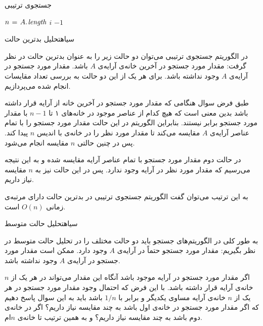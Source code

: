 {\begin{algorithm}
\caption{جستجوی ترتیبی}\label{ch1:alg:lnrSearch}
\begin{latin}
\begin{algorithmic}[1]
		\State $n \mathrel{\hspace{1pt}=\hspace{1pt}} A.\hspace*{1pt}\mathit{length}$
						\State \Return $i$
				\EndIf
		\EndFor
		\State \Return	$-1$		
\EndFunction
\end{algorithmic}
\end{latin}
\end{algorithm}


‌سیاه{تحلیل بدترین حالت}

در الگوریتم جستجوی ترتیبی می‌توان دو حالت زیر را به عنوان بدترین حالت در نظر گرفت:
 مقدار مورد جستجو در آخرین خانه‌ی آرایه‌ی {$A$} باشد.
 مقدار مورد جستجو در آرایه‌ی {$A$} وجود نداشته باشد.
برای هر یک از این دو حالت به بررسی تعداد مقایسات انجام ‌شده می‌پردازیم.

طبق فرض سوال هنگامی که مقدار مورد جستجو در آخرین خانه از آرایه قرار داشته باشد بدین معنی است که هیچ ‌کدام از عناصر موجود در خانه‌های ۱ تا {$n-1$} با مقدار مورد جستجو برابر نیستند. بنابراین الگوریتم در این حالت مقدار مورد جستجو را با تمام عناصر آرایه‌ی {$A$} مقایسه می‌کند تا مقدار مورد نظر را در خانه‌ی با اندیس {$n$} پیدا کند. پس در چنین حالتی {$n$} مقایسه انجام می‌شود.

در حالت دوم مقدار مورد جستجو با تمام عناصر آرایه مقایسه شده و به این نتیجه می‌رسیم که مقدار مورد نظر در آرایه وجود ندارد. پس در این حالت نیز به {$n$} مقایسه نیاز داریم.

به این ترتیب می‌توان گفت الگوریتم جستجوی ترتیبی در بدترین حالت دارای مرتبه‌ی زمانی {$O(n)$} است.

‌سیاه{تحلیل حالت متوسط}

به طور کلی در الگوریتم‌های جستجو باید دو حالت مختلف را در تحلیل حالت متوسط در نظر بگیریم:
 مقدار مورد جستجو حتماً در آرایه‌ی {$A$} وجود دارد.
 ممکن است مقدار مورد جستجو در آرایه‌ی {$A$} وجود نداشته باشد.

اگر مقدار مورد جستجو در آرایه موجود باشد آنگاه این مقدار می‌تواند در هر یک از {$n$} خانه‌ی آرایه قرار داشته باشد. با این فرض که احتمال وجود مقدار مورد جستجو در هر یک از {$n$} خانه‌ی آرایه مساوی یکدیگر و برابر با {$1/n$} باشد باید به این سوال پاسخ دهیم که اگر مقدار مورد جستجو در خانه‌ی اول باشد به چند مقایسه نیاز داریم؟ اگر در خانه‌ی دوم باشد به چند مقایسه نیاز داریم؟ و به همین ترتیب تا خانه‌ی {$n$}ام.

}
